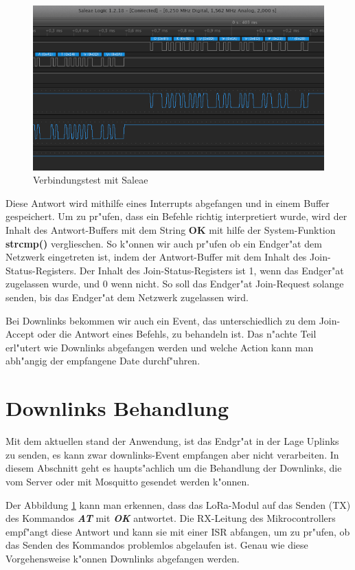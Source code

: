 \begin{figure}[h]
	\centering
	\includegraphics[width=16cm]{source/images/saleae}
	\caption{Verbindungstest mit Saleae\label{fig:saleae}}
\end{figure}

\vspace{5cm}
Diese Antwort wird mithilfe eines Interrupts abgefangen und in einem 
Buffer gespeichert. Um zu pr"ufen, dass ein Befehle richtig interpretiert wurde, wird 
der Inhalt des Antwort-Buffers mit dem String \textbf{OK} mit hilfe der 
System-Funktion 
\textbf{strcmp()} verglieschen. So k"onnen wir auch pr"ufen ob ein Endger"at dem 
Netzwerk eingetreten ist, indem der Antwort-Buffer mit dem Inhalt des 
Join-Status-Registers. Der Inhalt des Join-Status-Registers ist 1, wenn das Endger"at 
zugelassen wurde, und 0 wenn nicht. So soll das Endger"at Join-Request solange 
senden, bis das Endger"at dem Netzwerk zugelassen wird.

Bei Downlinks bekommen wir auch ein Event, das unterschiedlich zu dem Join-Accept 
oder die Antwort eines Befehls, zu behandeln ist. Das n"achte Teil erl"utert wie 
Downlinks abgefangen werden und welche Action kann man abh"angig der empfangene Date 
durchf"uhren.

\section{Downlinks Behandlung}\label{MQTT} 

Mit dem aktuellen stand der Anwendung, ist das Endgr"at in der Lage Uplinks zu senden, es 
kann zwar downlinks-Event empfangen aber nicht verarbeiten. In diesem Abschnitt geht es 
haupts"achlich um die Behandlung der Downlinks, die vom Server oder mit Mosquitto gesendet 
werden k"onnen. 

Der Abbildung \ref{fig:saleae} kann man erkennen, dass das LoRa-Modul auf 
das Senden (TX) des Kommandos \textbf{\textit{AT}} mit \textbf{\textit{OK}} antwortet. Die 
RX-Leitung des Mikrocontrollers 
empf"angt diese Antwort und kann sie mit einer \ac{ISR} abfangen, um zu pr"ufen, ob das 
Senden des Kommandos problemlos abgelaufen ist. Genau wie diese Vorgehensweise k"onnen 
Downlinks abgefangen werden.

